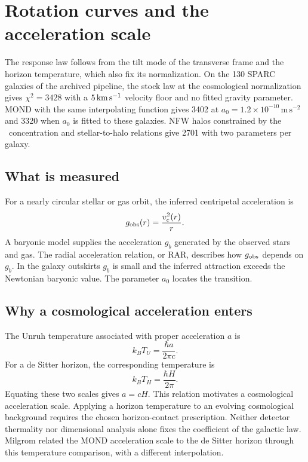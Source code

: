 \section{Rotation curves and the acceleration scale}
\label{sec:rotation}

The response law follows from the tilt mode of the transverse frame and
the horizon temperature, which also fix its normalization. On the 130
SPARC galaxies of the archived pipeline, the stock law at the
cosmological normalization gives $\chi^2=3428$ with a $5\,\mathrm{km\,s^{-1}}$ velocity
floor and no fitted gravity parameter. MOND with the same interpolating
function gives 3402 at $a_0=1.2\times10^{-10}\,\mathrm{m\,s^{-2}}$ and
3320 when $a_0$ is fitted to these galaxies. NFW halos constrained by the
\LCDM\ concentration and stellar-to-halo relations give 2701 with two
parameters per galaxy.

\subsection{What is measured}

For a nearly circular stellar or gas orbit, the inferred centripetal
acceleration is
\begin{equation}
g_{\rm obs}(r)=\frac{v_c^2(r)}{r}.
\end{equation}
A baryonic model supplies the acceleration $g_b$ generated by the observed
stars and gas. The radial acceleration relation, or RAR, describes how
$g_{\rm obs}$ depends on $g_b$. In the galaxy outskirts $g_b$ is small and
the inferred attraction exceeds the Newtonian baryonic value. The
parameter $a_0$ locates the transition.

\subsection{Why a cosmological acceleration enters}

The Unruh temperature associated with proper acceleration $a$ is
\begin{equation}
k_BT_U=\frac{\hbar a}{2\pi c}.
\end{equation}
For a de Sitter horizon, the corresponding temperature is
\begin{equation}
k_BT_H=\frac{\hbar H}{2\pi}.
\end{equation}
Equating these two scales gives $a=cH$. This relation motivates a
cosmological acceleration scale. Applying a horizon temperature to an
evolving cosmological background requires the chosen horizon-contact
prescription. Neither detector thermality nor dimensional analysis alone
fixes the coefficient of the galactic law. Milgrom related the MOND acceleration scale to the de Sitter
horizon through this temperature comparison, with a different interpolation.
\cite{unruh,gibbons,milgrom1999}

